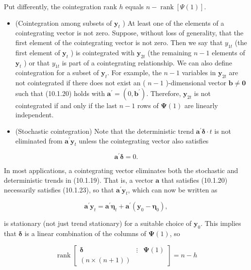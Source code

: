 \documentclass[10pt]{article}
\begin{document}
Put differently, the cointegration rank $h$ equals $n-\operatorname{rank}[\Psi(1)]$.

\begin{itemize}
  \item (Cointegration among subsets of $\mathbf{y}_{t}$ ) At least one of the elements of a cointegrating vector is not zero. Suppose, without loss of generality, that the first element of the cointegrating vector is not zero. Then we say that $y_{1 t}$ (the first element of $\mathbf{y}_{t}$ ) is cointegrated with $\mathbf{y}_{2 t}$ (the remaining $n-1$ elements of $\mathbf{y}_{t}$ ) or that $y_{1 t}$ is part of a cointegrating relationship. We can also define cointegration for a subset of $\mathbf{y}_{t}$. For example, the $n-1$ variables in $\mathbf{y}_{2 t}$ are not cointegrated if there does not exist an ( $n-1$ )-dimensional vector $\mathbf{b} \neq \mathbf{0}$ such that (10.1.20) holds with $\mathbf{a}^{\prime}=\left(0, \mathbf{b}^{\prime}\right)$. Therefore, $\mathbf{y}_{2 t}$ is not cointegrated if and only if the last $n-1$ rows of $\boldsymbol{\Psi}(1)$ are linearly independent.
  \item (Stochastic cointegration) Note that the deterministic trend $\mathbf{a}^{\prime} \boldsymbol{\delta} \cdot t$ is not eliminated from $\mathbf{a}^{\prime} \mathbf{y}_{t}$ unless the cointegrating vector also satisfies
\end{itemize}


\begin{equation*}
\mathbf{a}^{\prime} \boldsymbol{\delta}=0 . \tag{10.1.23}
\end{equation*}


In most applications, a cointegrating vector eliminates both the stochastic and deterministic trends in (10.1.19). That is, a vector $\mathbf{a}$ that satisfies (10.1.20) necessarily satisfies (10.1.23), so that $\mathbf{a}^{\prime} \mathbf{y}_{t}$, which can now be written as


\begin{equation*}
\mathbf{a}^{\prime} \mathbf{y}_{t}=\mathbf{a}^{\prime} \boldsymbol{\eta}_{t}+\mathbf{a}^{\prime}\left(\mathbf{y}_{0}-\boldsymbol{\eta}_{0}\right), \tag{10.1.24}
\end{equation*}


is stationary (not just trend stationary) for a suitable choice of $\mathbf{y}_{0}$. This implies that $\boldsymbol{\delta}$ is a linear combination of the columns of $\boldsymbol{\Psi}(1)$, so

\[
\operatorname{rank}\left[\begin{array}{lll}
\boldsymbol{\delta} & \vdots & \boldsymbol{\Psi}(1)  \tag{10.1.25}\\
(n \times(n+1))
\end{array}\right]=n-h
\]
\end{document}
